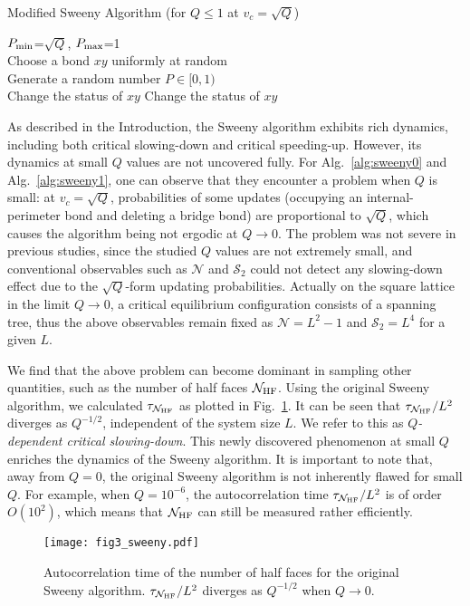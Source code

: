 \documentclass[aps,pre,twocolumn,superscriptaddress,longbibliography,floatfix]{revtex4-2}
\begin{document}
\begin{algorithm}[b]
\caption{Modified Sweeny Algorithm (for $Q \leq 1$ at $v_c=\sqrt{Q}$)}
\label{alg:sweeny1}
$P_{\rm min}$=$\sqrt{Q}$, $P_{\rm max}$=1\\
Choose a bond $xy$ uniformly at random\\
Generate a random number $P \in [0,1)$\\
{Change the status of $xy$}
{Change the status of $xy$}
\end{algorithm}


As described in the Introduction, the Sweeny algorithm exhibits rich dynamics, including both critical slowing-down and critical speeding-up. However, its dynamics at small $Q$ values are not uncovered fully. For Alg.~\ref{alg:sweeny0} and Alg.~\ref{alg:sweeny1}, one can observe that 
they encounter a problem when $Q$ is small: at  $v_c=\sqrt{Q}$,
probabilities of some updates (occupying an internal-perimeter bond and deleting a bridge bond) are proportional
to $\sqrt{Q}$, which causes the algorithm being not ergodic at $Q \to 0$. 
{The problem was not severe in previous studies, since the studied $Q$ values are not extremely small, 
and conventional observables such as $\mathcal{N}$ and $\mathcal{S}_2$ could not detect any slowing-down effect due to 
the $\sqrt{Q}$-form updating probabilities.}
Actually on the square lattice in the limit $Q \to 0$, a critical equilibrium configuration consists of a spanning tree, 
thus the above observables remain fixed as $\mathcal{N}=L^2-1$ and $\mathcal{S}_2=L^4$ for a given $L$.


We find that the above problem can become dominant in sampling other quantities, such as the number of half faces $\mathcal{N}_{\rm HF}$.
Using the original Sweeny algorithm, we calculated $\tau_{\mathcal{N}_{\rm HF}}$ as plotted in Fig.~\ref{tauNHF:sweeny}. It can be seen that $\tau_{\mathcal{N}_{\rm HF}}/L^2$ diverges as $Q^{-1/2}$, independent of the system size $L$. We refer to this as {\it $Q$-dependent critical slowing-down}.
This newly discovered phenomenon at small $Q$ enriches the dynamics of the Sweeny algorithm.
It is important to note that, away from $Q=0$, the original Sweeny algorithm is not inherently flawed for small $Q$. 
For example, when $Q=10^{-6}$, the autocorrelation time $\tau_{\mathcal{N}_{\rm HF}}/L^2$ is of  order $O(10^2)$, which means that $\mathcal{N}_{\rm HF}$ can still be measured rather efficiently.

\begin{figure}[t] 
\centering
\texttt{[image: fig3\_sweeny.pdf]}
\caption{Autocorrelation time of the number of half faces for the original Sweeny algorithm. $\tau_{\mathcal{N}_{\rm HF}}/L^2$ diverges as $Q^{-1/2}$ when $Q \to 0$. }
\label{tauNHF:sweeny}
\end{figure}
\end{document}
